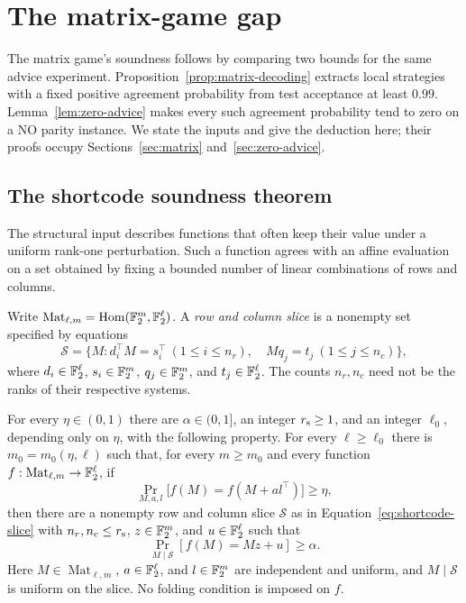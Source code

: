 \section{The matrix-game gap}\label{sec:matrix-gap}

The matrix game's soundness follows by comparing two bounds for the same
advice experiment.  Proposition~\ref{prop:matrix-decoding} extracts local
strategies with a fixed positive agreement probability from test acceptance
at least $0.99$.  Lemma~\ref{lem:zero-advice} makes every such agreement probability
tend to zero on a NO parity instance.  We state the inputs and give the
deduction here; their proofs occupy Sections~\ref{sec:matrix}
and~\ref{sec:zero-advice}.

\subsection{The shortcode soundness theorem}

The structural input describes functions that often keep their value
under a uniform rank-one perturbation.  Such a function agrees with an
affine evaluation on a set obtained by fixing a bounded number of linear
combinations of rows and columns.

Write $\operatorname{Mat}_{\ell,m}=\operatorname{Hom}(\mathbb F_2^m,\mathbb F_2^\ell)$.
A \emph{row and column slice} is a nonempty set specified by equations
\begin{equation}
 \mathcal S=
 \{M:d_i^\top M=s_i^\top\ (1\le i\le n_r),\quad
          Mq_j=t_j\ (1\le j\le n_c)\},
 \label{eq:shortcode-slice}
\end{equation}
where $d_i\in\mathbb F_2^\ell$, $s_i\in\mathbb F_2^m$, $q_j\in\mathbb F_2^m$, and
$t_j\in\mathbb F_2^\ell$.  The counts $n_r,n_c$ need not be the ranks of their
respective systems.

\begin{theorem}
\label{thm:shortcode}
For every $\eta\in(0,1)$ there are $\alpha\in(0,1]$, an integer
$r_{\rm s}\ge1$, and an integer $\ell_0$, depending only on $\eta$,
with the following property.  For every $\ell\ge\ell_0$ there is
$m_0=m_0(\eta,\ell)$ such that, for every $m\ge m_0$ and every function
$f:\operatorname{Mat}_{\ell,m}\to\mathbb F_2^\ell$, if
\begin{equation}
 \Pr_{M,a,l}\bigl[f(M)=f(M+a l^\top)\bigr]\ge\eta,
 \label{eq:shortcode-acceptance}
\end{equation}
then there are a nonempty row and column slice $\mathcal S$ as in
Equation~\eqref{eq:shortcode-slice} with
$n_r,n_c\le r_{\rm s}$, $z\in\mathbb F_2^m$, and $u\in\mathbb F_2^\ell$ such that
\begin{equation}
 \Pr_{M\mid\mathcal S}[f(M)=Mz+u]\ge\alpha.
 \label{eq:shortcode-conclusion}
\end{equation}
Here $M\in\operatorname{Mat}_{\ell,m}$, $a\in\mathbb F_2^\ell$, and $l\in\mathbb F_2^m$ are independent and
uniform, and $M\mid\mathcal S$ is uniform on the slice.  No folding
condition is imposed on $f$.
\end{theorem}



